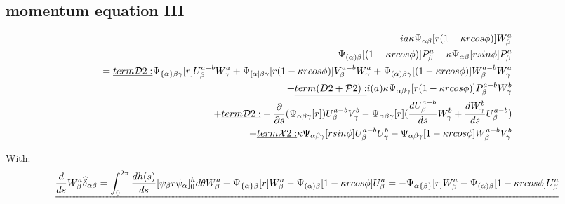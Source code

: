 \documentclass{Note}
\begin{document}
\subsection{momentum equation III}


\begin{equation}
\begin{aligned}
-ia\kappa \Psi_{\alpha\beta}[r(1-\kappa rcos\phi)]W_\beta^a\\
-\Psi_{(\alpha)\beta}[(1-\kappa r cos\phi)]P_\beta^a-\kappa \Psi_{\alpha\beta}[r sin\phi]P_\beta^a\\
=
\underline{term \mathcal{D}2:}  \Psi_{\{\alpha\}\beta\gamma} [r]U_\beta^{a-b}W_\gamma^a
+\Psi_{[\alpha]\beta\gamma} [r(1-\kappa rcos\phi)]V_\beta^{a-b}W_\gamma^a
+ \Psi_{(\alpha)\beta\gamma} [(1-\kappa rcos\phi)]W_\beta^{a-b}W_\gamma^a\\
+\underline{term\mathcal({D}2+\mathcal{P}2):}  i(a)\kappa \Psi_{\alpha\beta\gamma}[r(1-\kappa r cos\phi)]P_\beta^{a-b}W_\gamma^{b}\\
+\underline{term \mathcal{D}2:} -{{\partial }\over {\partial s}}(\Psi_{\alpha\beta\gamma}[r])U_\beta^{a-b}V_\gamma^{b}
-\Psi_{\alpha\beta\gamma}[r]({{d U_\beta^{a-b} \over {d s}}W_\gamma^{b}}+{dW_\gamma^{b}\over ds}U_\beta^{a-b})\\
+\underline{term \mathcal{X}2:} \kappa \Psi_{\alpha\beta\gamma}[rsin\phi]U_\beta^{a-b}U_\gamma^b- \Psi_{\alpha\beta\gamma}[1-\kappa r cos\phi]W_\beta^{a-b}V_\gamma^b\\
\end{aligned}
\end{equation}

With:
\begin{equation}
\begin{aligned}
\uuline{{d \over ds} W_\beta^a \widehat{\delta }_{\alpha\beta}=\int_0^{2\pi}{dh(s)\over ds} [ \psi_\beta r  \psi_\alpha ]_0^h d\theta W_\beta^a+\Psi_{\{\alpha\}\beta}[r]W_\beta^a
-\Psi_{(\alpha)\beta}[1-\kappa r cos\phi]U_\beta^a =-\Psi_{\alpha\{\beta\}}[r]W_\beta^a-\Psi_{(\alpha)\beta}[1-\kappa r cos\phi]U_\beta^a }
\end{aligned}
\end{equation}
\end{document}
